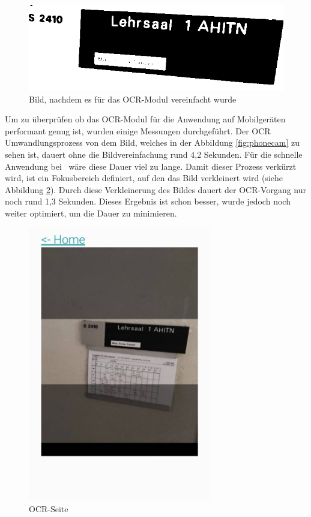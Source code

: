 \begin{figure}
    \centering
    \includegraphics[width=120mm]{media/OCR/compressed}
    \caption{Bild, nachdem es für das OCR-Modul vereinfacht wurde}
    \label{ocroptimised}
\end{figure}


\pagebreak

\label{sec:ocrmessung}

Um zu überprüfen ob das OCR-Modul für die Anwendung auf Mobilgeräten performant genug ist, wurden einige Messungen durchgeführt. Der OCR Umwandlungsprozess von dem Bild, welches in der Abbildung \ref{fig:phonecam} zu sehen ist, dauert ohne die Bildvereinfachung rund 4,2 Sekunden. Für die schnelle Anwendung bei \ZELIA\ wäre diese Dauer viel zu lange. Damit dieser Prozess verkürzt wird, ist ein Fokusbereich definiert, auf den das Bild verkleinert wird (siehe Abbildung \ref{fig:ocrfocus}). Durch diese Verkleinerung des Bildes dauert der OCR-Vorgang nur noch rund 1,3 Sekunden. Dieses Ergebnis ist schon besser, wurde jedoch noch weiter optimiert, um die Dauer zu minimieren. 

\begin{figure}[H]
    \centering
    \includegraphics[width=80mm]{media/WebComponents/OCRSeite_light.jpg}
    \caption{OCR-Seite}
    \label{fig:ocrfocus}
\end{figure}


